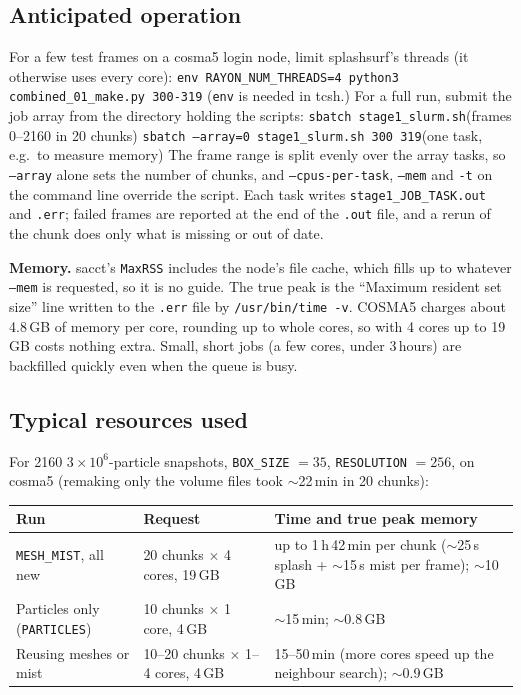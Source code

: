 \documentclass[11pt]{article}
\newcommand{\pc}[1]{\texttt{#1}}
\begin{document}
\subsection{Anticipated operation}
For a few test frames on a cosma5 login node, limit splashsurf's threads (it otherwise uses every core):\newline
\pc{env RAYON\_NUM\_THREADS=4 python3 combined\_01\_make.py 300-319}\newline
(\pc{env} is needed in tcsh.) For a full run, submit the job array from the directory holding the scripts:\newline
\pc{sbatch stage1\_slurm.sh}\hfill(frames 0--2160 in 20 chunks)\newline
\pc{sbatch --array=0 stage1\_slurm.sh 300 319}\hfill(one task, e.g.\ to measure memory)\newline
The frame range is split evenly over the array tasks, so \pc{--array} alone sets the number of chunks, and \pc{--cpus-per-task}, \pc{--mem} and \pc{-t} on the command line override the script. Each task writes \pc{stage1\_JOB\_TASK.out} and \pc{.err}; failed frames are reported at the end of the \pc{.out} file, and a rerun of the chunk does only what is missing or out of date.
 
\textbf{Memory.} sacct's \pc{MaxRSS} includes the node's file cache, which fills up to whatever \pc{--mem} is requested, so it is no guide. The true peak is the ``Maximum resident set size'' line written to the \pc{.err} file by \pc{/usr/bin/time -v}. COSMA5 charges about 4.8\,GB of memory per core, rounding up to whole cores, so with 4 cores up to 19\,GB costs nothing extra. Small, short jobs (a few cores, under 3\,hours) are backfilled quickly even when the queue is busy.
 
\subsection{Typical resources used}
For 2160 $3\times10^6$-particle snapshots, \pc{BOX\_SIZE} $=35$, \pc{RESOLUTION} $=256$, on cosma5 (remaking only the volume files took $\sim$22\,min in 20 chunks):
 
\begin{center}\small
\begin{tabular}{@{}P{4.4cm} P{4.6cm} P{5.5cm}@{}}
\hline
\textbf{Run} & \textbf{Request} & \textbf{Time and true peak memory} \\
\hline
\pc{MESH\_MIST}, all new & 20 chunks $\times$ 4 cores, 19\,GB & up to 1\,h\,42\,min per chunk ($\sim$25\,s splash + $\sim$15\,s mist per frame); $\sim$10\,GB \\
Particles only (\pc{PARTICLES}) & 10 chunks $\times$ 1 core, 4\,GB & $\sim$15\,min; $\sim$0.8\,GB \\
Reusing meshes or mist & 10--20 chunks $\times$ 1--4 cores, 4\,GB & 15--50\,min (more cores speed up the neighbour search); $\sim$0.9\,GB \\
\hline
\end{tabular}
\end{center}
 
\end{document}
